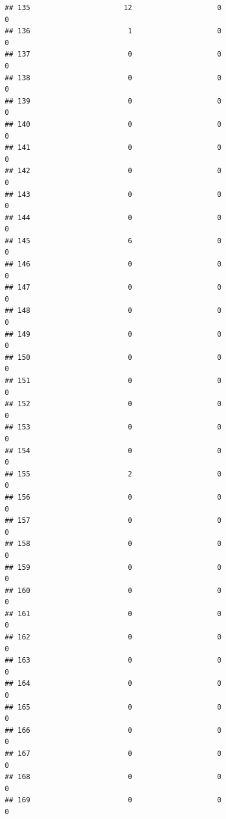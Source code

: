 \documentclass[
]{article}
\begin{document}
\begin{verbatim}
## 135                      12                    0                      0
## 136                       1                    0                      0
## 137                       0                    0                      0
## 138                       0                    0                      0
## 139                       0                    0                      0
## 140                       0                    0                      0
## 141                       0                    0                      0
## 142                       0                    0                      0
## 143                       0                    0                      0
## 144                       0                    0                      0
## 145                       6                    0                      0
## 146                       0                    0                      0
## 147                       0                    0                      0
## 148                       0                    0                      0
## 149                       0                    0                      0
## 150                       0                    0                      0
## 151                       0                    0                      0
## 152                       0                    0                      0
## 153                       0                    0                      0
## 154                       0                    0                      0
## 155                       2                    0                      0
## 156                       0                    0                      0
## 157                       0                    0                      0
## 158                       0                    0                      0
## 159                       0                    0                      0
## 160                       0                    0                      0
## 161                       0                    0                      0
## 162                       0                    0                      0
## 163                       0                    0                      0
## 164                       0                    0                      0
## 165                       0                    0                      0
## 166                       0                    0                      0
## 167                       0                    0                      0
## 168                       0                    0                      0
## 169                       0                    0                      0

\end{verbatim}
\end{document}
